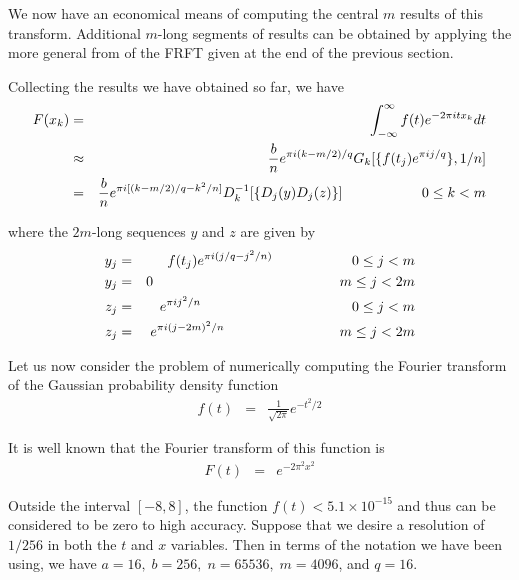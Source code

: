 We now have an economical means of computing the central $m$ results
of this transform.  Additional $m$-long segments of results can be
obtained by applying the more general from of the FRFT given at the
end of the previous section.

\vspace{2ex}

Collecting the results we have obtained so far, we have
\begin{eqnarray}
F(x_k) &=& \int _{-\infty} ^\infty f(t) e^{-2 \pi i t x_k} dt \\
       &\approx& \frac{b}{n} e^{\pi i (k - m / 2) / q} 
       G_k [\{f(t_j) e^{\pi i j / q} \}, 1 / n] \\
       &=& \frac{b}{n} e^{\pi i [(k - m / 2) / q - k^2 / n]}
         D_k^{-1} [\{ D_j (y) D_j (z) \}] \hspace{20mm} 0 \leq k < m
\end{eqnarray}

\noindent
where the $2m$-long sequences $y$ and $z$ are given by
\begin{eqnarray}
y_j &=& f(t_j) e^{\pi i (j / q - j^2 / n)} \hspace{20mm} 0 \leq j < m \\
y_j &=& 0 \hspace{47mm} m \leq j < 2 m \\
z_j &=& e^{\pi i j^2 / n}  \hspace{38mm} 0 \leq j < m \\
z_j &=& e^{\pi i (j - 2m)^2 / n} \hspace{29mm}
    m \leq j < 2 m
\end{eqnarray}

Let us now consider the problem of numerically computing the Fourier
transform of the Gaussian probability density function
\begin{eqnarray}
f(t) &=& \frac{1}{\sqrt{2 \pi}} e^{-t^2/2}
\end{eqnarray}

\noindent
It is well known that the Fourier transform of this function is
\begin{eqnarray}
F(t) &=& e^{-2 \pi^2 x^2}
\end{eqnarray}

\noindent
Outside the interval $[-8, 8]$, the function $f(t) < 5.1 \times
10^{-15}$ and thus can be considered to be zero to high accuracy.
Suppose that we desire a resolution of $1 / 256$ in both the $t$ and
$x$ variables.  Then in terms of the notation we have been using, we
have $a = 16, \; b = 256, \; n = 65536, \; m = 4096$, and $q = 16$.

